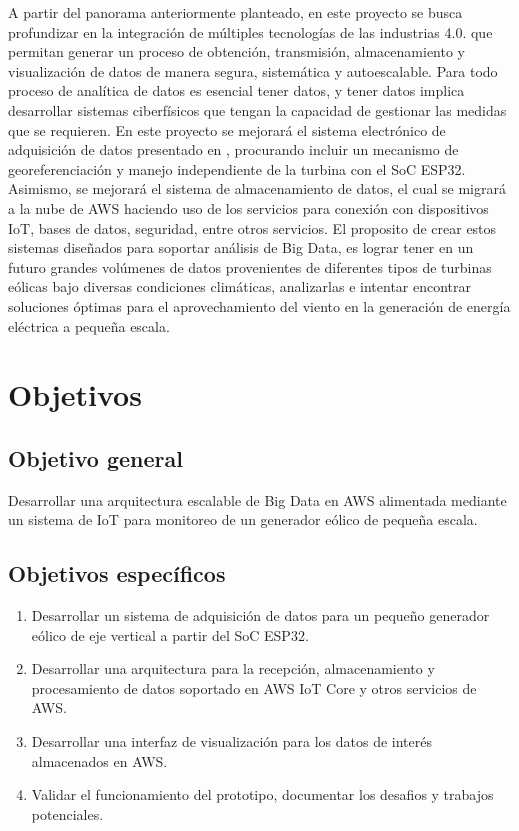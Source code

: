 \documentclass[letterpaper,12pt, oneside]{book}
\begin{document}
A partir del panorama anteriormente planteado, en este proyecto se busca profundizar en la integración de múltiples tecnologías de las industrias 4.0. que permitan generar un proceso de obtención, transmisión, almacenamiento y visualización de datos de manera segura, sistemática y autoescalable. Para todo proceso de analítica de datos es esencial tener datos, y tener datos implica desarrollar sistemas ciberfísicos que tengan la capacidad de gestionar las medidas que se requieren. En este proyecto se mejorará el sistema electrónico de adquisición de datos presentado en \cite{ref12}, procurando incluir un mecanismo de georeferenciación y manejo independiente de la turbina con el SoC ESP32. Asimismo, se mejorará el sistema de almacenamiento de datos, el cual se migrará a la nube de AWS haciendo uso de los servicios para conexión con dispositivos IoT, bases de datos, seguridad, entre otros servicios. El proposito de crear estos sistemas diseñados para soportar análisis de Big Data, es lograr tener en un futuro grandes volúmenes de datos provenientes de diferentes tipos de turbinas eólicas bajo diversas condiciones climáticas, analizarlas e intentar encontrar soluciones óptimas para el aprovechamiento del viento en la generación de energía eléctrica a pequeña escala.



\section{Objetivos} \label{sec4}

\subsection{Objetivo general}

Desarrollar una arquitectura escalable de Big Data en AWS alimentada mediante un sistema de IoT para monitoreo de un generador eólico de pequeña escala.

\subsection{Objetivos específicos}
\begin{enumerate}

    \item Desarrollar un sistema de adquisición de datos para un pequeño generador eólico de eje vertical a partir del SoC ESP32. 
    
    \item Desarrollar una arquitectura para la recepción, almacenamiento y procesamiento de datos soportado en AWS IoT Core y otros servicios de AWS. 

    \item Desarrollar una interfaz de visualización para los datos de interés almacenados en AWS. 
    
    \item Validar el funcionamiento del prototipo, documentar los desafios y trabajos potenciales.

\end{enumerate}
\end{document}
